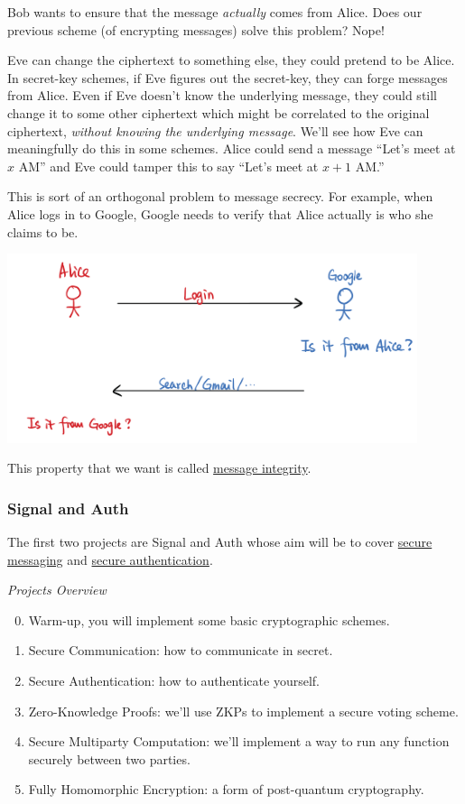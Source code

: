 Bob wants to ensure that the message \emph{actually} comes from Alice. Does our previous scheme (of encrypting messages) solve this problem? Nope!

Eve can change the ciphertext to something else, they could pretend to be Alice. In secret-key schemes, if Eve figures out the secret-key, they can forge messages from Alice. Even if Eve doesn't know the underlying message, they could still change it to some other ciphertext which might be correlated to the original ciphertext, \emph{without knowing the underlying message}. We'll see how Eve can meaningfully do this in some schemes. Alice could send a message ``Let's meet at $x$ AM'' and Eve could tamper this to say ``Let's meet at $x+1$ AM.''

This is sort of an orthogonal problem to message secrecy. For example, when Alice logs in to Google, Google needs to verify that Alice actually is who she claims to be.

\begin{center}
    \includegraphics[width=0.9\textwidth]{images/2023-01-26/authentication.png}
\end{center}

This property that we want is called \ul{message integrity}.

\subsubsection{Signal and Auth}

The first two projects are Signal and Auth whose aim will be to cover \ul{secure messaging} and \ul{secure authentication}.

\emph{Projects Overview}
\begin{enumerate}
    \setcounter{enumi}{-1}
    \item Warm-up, you will implement some basic cryptographic schemes.
    \item Secure Communication: how to communicate in secret.
    \item Secure Authentication: how to authenticate yourself.
    \item Zero-Knowledge Proofs: we'll use ZKPs to implement a secure voting scheme.
    \item Secure Multiparty Computation: we'll implement a way to run any function securely between two parties.
    \item Fully Homomorphic Encryption: a form of post-quantum cryptography.
\end{enumerate}

